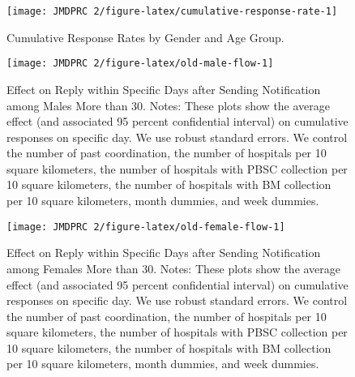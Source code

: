 \documentclass[12pt, a4paper]{article}
\begin{document}
\begin{figure}[H]
\texttt{[image: JMDPRC~2/figure-latex/cumulative-response-rate-1]} \caption{Cumulative Response Rates by Gender and Age Group.}\label{fig:cumulative-response-rate}
\end{figure}

\begin{figure}[H]
\texttt{[image: JMDPRC~2/figure-latex/old-male-flow-1]} \caption{Effect on Reply within Specific Days after Sending Notification among Males More than 30. Notes: These plots show the average effect (and associated 95 percent confidential interval) on cumulative responses on specific day. We use robust standard errors. We control the number of past coordination, the number of hospitals per 10 square kilometers, the number of hospitals with PBSC collection per 10 square kilometers, the number of hospitals with BM collection per 10 square kilometers, month dummies, and week dummies.}\label{fig:old-male-flow}
\end{figure}

\begin{figure}[H]
\texttt{[image: JMDPRC~2/figure-latex/old-female-flow-1]} \caption{Effect on Reply within Specific Days after Sending Notification among Females More than 30. Notes: These plots show the average effect (and associated 95 percent confidential interval) on cumulative responses on specific day. We use robust standard errors. We control the number of past coordination, the number of hospitals per 10 square kilometers, the number of hospitals with PBSC collection per 10 square kilometers, the number of hospitals with BM collection per 10 square kilometers, month dummies, and week dummies.}\label{fig:old-female-flow}
\end{figure}
\end{document}

